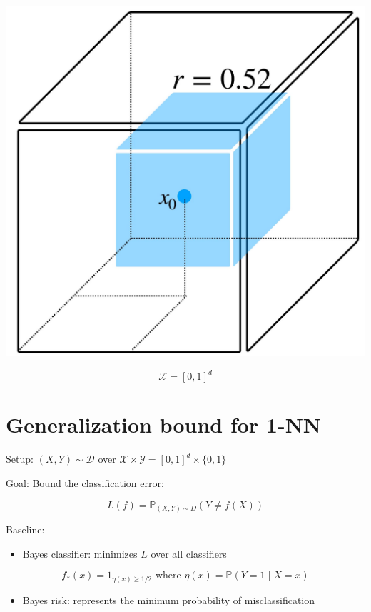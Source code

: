 \documentclass[10pt]{article}
\begin{document}
\begin{center}
\includegraphics[max width=\textwidth]{2023_12_30_f937b0007b5d87b39f79g-27}
\end{center}

$$
\mathscr{X}=[0,1]^{d}
$$

\section*{Generalization bound for 1-NN}
Setup: $(X, Y) \sim \mathscr{D}$ over $\mathscr{X} \times \mathscr{Y}=[0,1]^{d} \times\{0,1\}$

Goal: Bound the classification error:

$$
L(f)=\mathbb{P}_{(X, Y) \sim D}(Y \neq f(X))
$$

Baseline:

\begin{itemize}
  \item Bayes classifier: minimizes $L$ over all classifiers
\end{itemize}

$$
f_{*}(x)=1_{\eta(x) \geq 1 / 2} \text { where } \eta(x)=\mathbb{P}(Y=1 \mid X=x)
$$

\begin{itemize}
  \item Bayes risk: represents the minimum probability of misclassification
\end{itemize}
\end{document}
